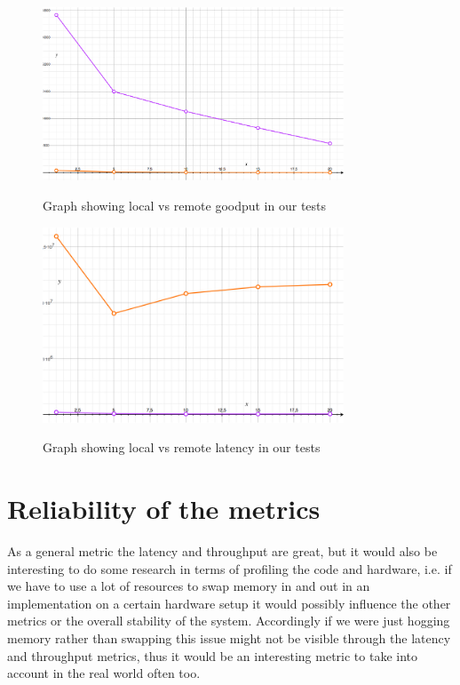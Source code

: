 \begin{figure}[h!]
    \centering
    \includegraphics[width=0.8\textwidth]{graf1.jpg}
    \label{fig:throughput}
    \caption{Graph showing local vs remote goodput in our tests}
\end{figure}

\begin{figure}[h!]
    \centering
    \includegraphics[width=0.8\textwidth]{graf2.jpg}
    \label{fig:latency}
    \caption{Graph showing local vs remote latency in our tests}
\end{figure}



\section{Reliability of the metrics}
As a general metric the latency and throughput are great, but it would also be interesting to do some research in terms of profiling the code and hardware, i.e. if we have to use a lot of resources to swap memory in and out in an implementation on a certain hardware setup it would possibly influence the other metrics or the overall stability of the system. Accordingly if we were just hogging memory rather than swapping this issue might not be visible through the latency and throughput metrics, thus it would be an interesting metric to take into account in the real world often too.
